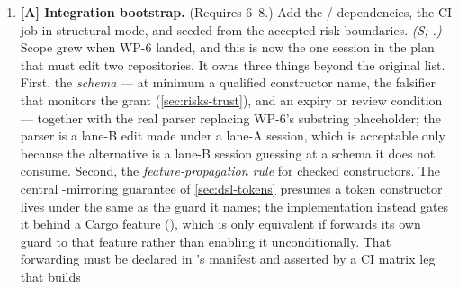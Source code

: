 \begin{enumerate}[leftmargin=2.2em, itemsep=0.35em]
   ceiling for trust grants or unproved counts per
  family; and  renders deterministic rustc-style
  diagnostics. The binary exposes  and 
  subcommands with exit code 0 for a passing policy run, 1 for
  structural or policy failure, and 2 for usage or internal error. 57
  tests, all passing, spanning unit coverage of every module, golden
  extraction against synthetic fixture crates (,
  , ), and CLI integration
  tests asserting the exit-code contract. One item is carried forward,
  not closed:  accepts any registered
  trust constructor without validating it against a
   schema, because that schema is still WP-9's
  deliverable (marked by an explicit  at the call
  site);  enforces everything else structurally now.
  All five  crates are implemented; 
  was the sole remaining gate on the integration bootstrap (9), which
  is now the only session standing before \dotnetrs{} can depend on
  this workspace.
\item \textbf{[A] Integration bootstrap.} (Requires 6--8.) Add the
  / dependencies, the
   CI job in structural mode, and
   seeded from the accepted-risk boundaries.
  \emph{(S; .)}
  Scope grew when WP-6 landed, and this is now the one session in the
  plan that must edit two repositories. It owns three things beyond
  the original list. First, the  \emph{schema} ---
  at minimum a qualified constructor name, the falsifier that monitors
  the grant (\cref{sec:risks-trust}), and an expiry or review
  condition --- together with the real parser replacing WP-6's
  substring placeholder; the parser is a lane-B edit made under a
  lane-A session, which is acceptable only because the alternative is
  a lane-B session guessing at a schema it does not consume.
  Second, the \emph{feature-propagation rule} for checked
  constructors. The central -mirroring guarantee of
  \cref{sec:dsl-tokens} presumes a token constructor lives under the
  same  as the guard it names; the implementation instead
  gates it behind a  Cargo feature
  (), which is only equivalent if \dotnetrs{}
  forwards its own guard  to that feature rather than
  enabling it unconditionally. That forwarding must be declared in
  \dotnetrs{}'s manifest and asserted by a CI matrix leg that builds

\end{enumerate}
